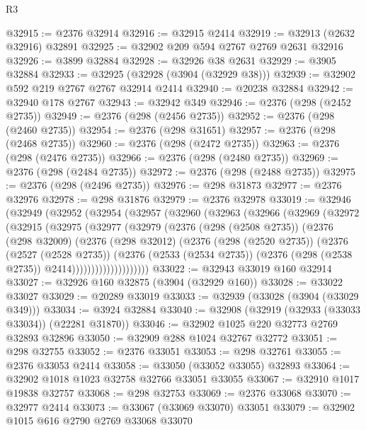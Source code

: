 \begin{lexlean}{R3}
\begin{coremodule}
@32915 := @2376 @32914
@32916 := @32915 @2414
@32919 := @32913 (@2632 @32916) @32891
@32925 := @32902 @209 @594 @2767 @2769 @2631 @32916
@32926 := @3899 @32884
@32928 := @32926 @38 @2631
@32929 := @3905 @32884
@32933 := @32925 (@32928 (@3904 (@32929 @38)))
@32939 := @32902 @592 @219 @2767 @2767 @32914 @2414
@32940 := @20238 @32884
@32942 := @32940 @178 @2767
@32943 := @32942 @349
@32946 := @2376 (@298 (@2452 @2735))
@32949 := @2376 (@298 (@2456 @2735))
@32952 := @2376 (@298 (@2460 @2735))
@32954 := @2376 (@298 @31651)
@32957 := @2376 (@298 (@2468 @2735))
@32960 := @2376 (@298 (@2472 @2735))
@32963 := @2376 (@298 (@2476 @2735))
@32966 := @2376 (@298 (@2480 @2735))
@32969 := @2376 (@298 (@2484 @2735))
@32972 := @2376 (@298 (@2488 @2735))
@32975 := @2376 (@298 (@2496 @2735))
@32976 := @298 @31873
@32977 := @2376 @32976
@32978 := @298 @31876
@32979 := @2376 @32978
@33019 := @32946
    (@32949
      (@32952
        (@32954
          (@32957
            (@32960
              (@32963
                (@32966
                  (@32969
                    (@32972
                      (@32915
                        (@32975
                          (@32977
                            (@32979
                              (@2376
                                (@298 (@2508 @2735))
                                (@2376
                                  (@298 @32009)
                                  (@2376
                                    (@298 @32012)
                                    (@2376
                                      (@298 (@2520 @2735))
                                      (@2376
                                        (@2527 (@2528 @2735))
                                        (@2376
                                          (@2533 (@2534 @2735))
                                          (@2376 (@298 (@2538 @2735)) @2414))))))))))))))))))))
@33022 := @32943 @33019 @160 @32914
@33027 := @32926 @160 @32875 (@3904 (@32929 @160))
@33028 := @33022 @33027
@33029 := @20289 @33019
@33033 := @32939 (@33028 (@3904 (@33029 @349)))
@33034 := @3924 @32884
@33040 := @32908 (@32919 (@32933 (@33033 @33034)) (@22281 @31870))
@33046 := @32902 @1025 @220 @32773 @2769 @32893 @32896
@33050 := @32909 @288 @1024 @32767 @32772
@33051 := @298 @32755
@33052 := @2376 @33051
@33053 := @298 @32761
@33055 := @2376 @33053 @2414
@33058 := @33050 (@33052 @33055) @32893
@33064 := @32902 @1018 @1023 @32758 @32766 @33051 @33055
@33067 := @32910 @1017 @19838 @32757
@33068 := @298 @32753
@33069 := @2376 @33068
@33070 := @32977 @2414
@33073 := @33067 (@33069 @33070) @33051
@33079 := @32902 @1015 @616 @2790 @2769 @33068 @33070

\end{coremodule}
\end{lexlean}
